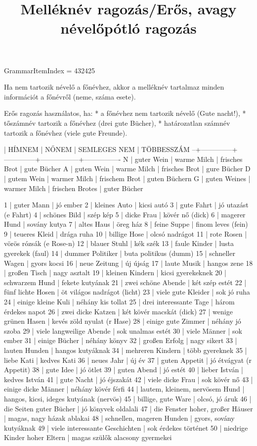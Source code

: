\title{Melléknév ragozás/Erős, avagy névelőpótló ragozás}

GrammarItemIndex = 432425

\begin{desc}
Ha nem tartozik névelő a főnévhez, akkor a melléknév tartalmaz minden információt a főnévről (neme, száma esete).

Erős ragozás használatos, ha:
* a főnévhez nem tartozik névelő (Gute nacht!),
* tőszámnév tartozik a főnévhez (drei gute Bücher),
* határozatlan számnév tartozik a főnévhez (viele gute Freunde).

  | HÍMNEM       | NŐNEM        | SEMLEGES NEM    | TÖBBESSZÁM
--+--------------+--------------+-----------------+----------------
N | guter Wein   | warme Milch  | frisches Brot   | gute Bücher
A | guten Wein   | warme Milch  | frisches Brot   | gure Bücher
D | gutem Wein   | warmer Milch | frischem Brot   | guten Büchern
G | guten Weines | warmer Milch | frischen Brotes | guter Bücher
\end{desc}

\begin{exmp}
1 | guter Mann | jó ember
2 | kleines Auto | kicsi autó
3 | gute Fahrt | jó utazást (e Fahrt)
4 | schönes Bild | szép kép
5 | dicke Frau | kövér nő (dick)
6 | magerer Hund | sovány kutya
7 | altes Haus | öreg ház
8 | feine Suppe | finom leves (fein)
9 | teueres Kleid | drága ruha
10 | billige Hose | olcsó nadrágot
11 | rote Rosen | vörös rózsák (e Rose-n)
12 | blauer Stuhl | kék szék
13 | faule Kinder | lusta gyerekek (faul)
14 | dummer Politiker | buta politikus (dumm)
15 | schneller Wagen | gyors kocsi
16 | neue Zeitung | új újság
17 | laute Musik | hangos zene
18 | großen Tisch | nagy asztalt
19 | kleinen Kindern | kicsi gyerekeknek
20 | schwarzem Hund | fekete kutyának
21 | zwei schöne Abende | két szép estét
22 | fünf lichte Hosen | öt világos nadrágot (licht)
23 | viele gute Kleider | sok jó ruha
24 | einige kleine Kuli | néhány kis tollat
25 | drei interessante Tage | három érdekes napot
26 | zwei dicke Katzen | két kövér macskát (dick)
27 | wenige grünen Hasen | kevés zöld nyulat (r Hase)
28 | einige gute Zimmer | néhány jó szoba
29 | viele langweilige Abende | sok unalmas estét
30 | viele Männer | sok ember
31 | einige Bücher | néhány könyv
32 | großen Erfolg | nagy sikert
33 | lauten Hunden | hangos kutyáknak
34 | mehreren Kindern | több gyereknek
35 | liebe Kati | kedves Kati
36 | neues Jahr | új év
37 | guten Appetit | jó étvágyat (r Appetit)
38 | gute Idee | jó ötlet
39 | guten Abend | jó estét
40 | lieber István | kedves István
41 | gute Nacht | jó éjszakát
42 | viele dicke Frau | sok kövér nő
43 | einige dicke Männer | néhány kövér férfi 
44 | lautem, kleinem, nervösem Hund | hangos, kicsi, ideges kutyának (nervös)
45 | billige, gute Ware | olcsó, jó áruk
46 | die Seiten guter Bücher | jó könyvek oldalali
47 | die Fenster hoher, großer Häuser | magas, nagy házak ablakai
48 | schnellen, mageren Hunden | gyors, sovány kutyáknak
49 | viele interessante Geschichten | sok érdekes történet
50 | niedrige Kinder hoher Eltern | magas szülők alacsony gyermekei
\end{exmp}

